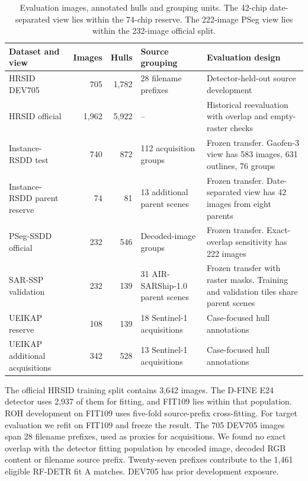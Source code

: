 \documentclass[journal]{IEEEtran}
\begin{document}
\begin{table}[t]
\centering
\caption{Evaluation images, annotated hulls and grouping units. The 42-chip date-separated view lies within the 74-chip reserve. The 222-image PSeg view lies within the 232-image official split.}
\label{tab:cohorts}
\footnotesize
\renewcommand{\arraystretch}{1.19}
\setlength{\tabcolsep}{5pt}
\begin{tabular}{@{}p{}rrp{}p{}@{}}
\toprule
Dataset and view & Images & Hulls & Source grouping & Evaluation design \\
\midrule
HRSID DEV705 & 705 & 1,782 & 28 filename prefixes & Detector-held-out source development \\
HRSID official & 1,962 & 5,922 & -- & Historical reevaluation with overlap and empty-raster checks \\
\addlinespace[1.5pt]
Instance-RSDD test & 740 & 872 & 112 acquisition groups & Frozen transfer. Gaofen-3 view has 583 images, 631 outlines, 76 groups \\
Instance-RSDD parent reserve & 74 & 81 & 13 additional parent scenes & Frozen transfer. Date-separated view has 42 images from eight parents \\
PSeg-SSDD official & 232 & 546 & Decoded-image groups & Frozen transfer. Exact-overlap sensitivity has 222 images \\
SAR-SSP validation & 232 & 139 & 31 AIR-SARShip-1.0 parent scenes & Frozen transfer with raster masks. Training and validation tiles share parent scenes \\
\addlinespace[1.5pt]
UEIKAP reserve & 108 & 139 & 18 Sentinel-1 acquisitions & Case-focused hull annotations \\
UEIKAP additional acquisitions & 342 & 528 & 13 Sentinel-1 acquisitions & Case-focused hull annotations \\
\bottomrule
\end{tabular}
\end{table}

The official HRSID training split contains 3,642 images. The D-FINE E24 detector uses 2,937 of them for fitting, and FIT109 lies within that population. ROH development on FIT109 uses five-fold source-prefix cross-fitting. For target evaluation we refit on FIT109 and freeze the result. The 705 DEV705 images span 28 filename prefixes, used as proxies for acquisitions. We found no exact overlap with the detector fitting population by encoded image, decoded RGB content or filename source prefix. Twenty-seven prefixes contribute to the 1,461 eligible RF-DETR fit A matches. DEV705 has prior development exposure.
\end{document}
